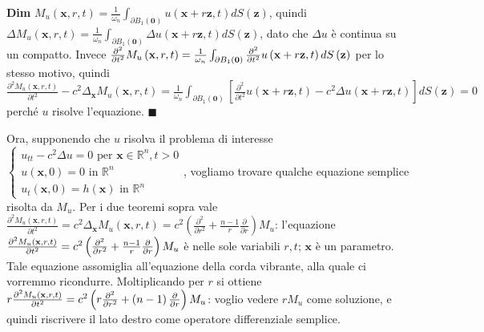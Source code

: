 \documentclass{article}
\begin{document}
\textbf{Dim} $M_{u}\left( \mathbf{x},r,t\right) =\frac{1}{\omega _{n}}%
\int_{\partial B_{1}\left( \mathbf{0}\right) }u\left( \mathbf{x}+r\mathbf{z}%
,t\right) dS\left( \mathbf{z}\right) $, quindi $\Delta M_{u}\left( \mathbf{x}%
,r,t\right) =\frac{1}{\omega _{n}}\int_{\partial B_{1}\left( \mathbf{0}%
\right) }\Delta u\left( \mathbf{x}+r\mathbf{z},t\right) dS\left( \mathbf{z}%
\right) $, dato che $\Delta u$ \`{e} continua su un compatto. Invece $\frac{%
\partial ^{2}}{\partial t^{2}}M_{u}\left( \mathbf{x},r,t\right) =\frac{1}{%
\omega _{n}}\int_{\partial B_{1}\left( \mathbf{0}\right) }\frac{\partial ^{2}%
}{\partial t^{2}}u\left( \mathbf{x}+r\mathbf{z},t\right) dS\left( \mathbf{z}%
\right) $ per lo stesso motivo, quindi $\frac{\partial ^{2}M_{u}\left( 
\mathbf{x},r,t\right) }{\partial t^{2}}-c^{2}\Delta _{\mathbf{x}}M_{u}\left( 
\mathbf{x},r,t\right) =\frac{1}{\omega _{n}}\int_{\partial B_{1}\left( 
\mathbf{0}\right) }\left[ \frac{\partial ^{2}}{\partial t^{2}}u\left( 
\mathbf{x}+r\mathbf{z},t\right) -c^{2}\Delta u\left( \mathbf{x}+r\mathbf{z}%
,t\right) \right] dS\left( \mathbf{z}\right) =0$ perch\'{e} $u$ risolve
l'equazione. $\blacksquare $

Ora, supponendo che $u$ risolva il problema di interesse $\left\{ 
\begin{array}{c}
u_{tt}-c^{2}\Delta u=0\text{ per }\mathbf{x}\in 
\mathbb{R}
^{n},t>0 \\ 
u\left( \mathbf{x},0\right) =0\text{ in }%
\mathbb{R}
^{n} \\ 
u_{t}\left( \mathbf{x},0\right) =h\left( \mathbf{x}\right) \text{ in }%
\mathbb{R}
^{n}%
\end{array}%
\right. $, vogliamo trovare qualche equazione semplice risolta da $M_{u}$.
Per i due teoremi sopra vale $\frac{\partial ^{2}M_{u}\left( \mathbf{x}%
,r,t\right) }{\partial t^{2}}=c^{2}\Delta _{\mathbf{x}}M_{u}\left( \mathbf{x}%
,r,t\right) =c^{2}\left( \frac{\partial ^{2}}{\partial r^{2}}+\frac{n-1}{r}%
\frac{\partial }{\partial r}\right) M_{u}$: l'equazione $\frac{\partial
^{2}M_{u}\left( \mathbf{x},r,t\right) }{\partial t^{2}}=c^{2}\left( \frac{%
\partial ^{2}}{\partial r^{2}}+\frac{n-1}{r}\frac{\partial }{\partial r}%
\right) M_{u}$ \`{e} nelle sole variabili $r,t$; $\mathbf{x}$ \`{e} un
parametro. Tale equazione assomiglia all'equazione della corda vibrante,
alla quale ci vorremmo ricondurre. Moltiplicando per $r$ si ottiene $r\frac{%
\partial ^{2}M_{u}\left( \mathbf{x},r,t\right) }{\partial t^{2}}=c^{2}\left(
r\frac{\partial ^{2}}{\partial r^{2}}+\left( n-1\right) \frac{\partial }{%
\partial r}\right) M_{u}$: voglio vedere $rM_{u}$ come soluzione, e quindi
riscrivere il lato destro come operatore differenziale semplice.
\end{document}
